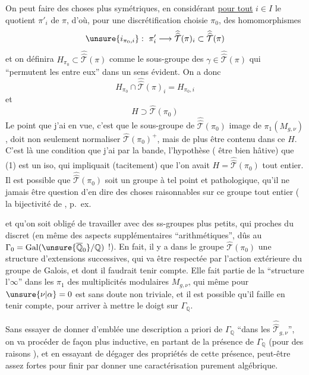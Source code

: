 On peut faire des choses plus symétriques, en considérant \uline{pour tout} $i\in I$ le quotient  $\pi'_i$ de $\pi$, d'où, pour une discrétification choisie $\pi_0$, des homomorphismes
\[
\unsure{i_{\pi_0,i}}:\ \pi'_i\longrightarrow
\widehat{\widehat{\mathcal T}}(\pi)_i\subset
\widehat{\widehat{\mathcal T}}(\pi)
\]
et on définira $H_{\pi_0}\subset\widehat{\widehat{\mathcal T}}(\pi)$ comme le sous-groupe des $\gamma\in\widehat{\widehat{\mathcal T}}(\pi)$ qui ``permutent les  entre eux'' dans un sens évident. On a donc
\[
\tag{7}
H_{\pi_0}\cap\widehat{\widehat{\mathcal T}}(\pi)_i=H_{\pi_0,i}
\]
et
\[
\tag{8}
H\supset\widehat{\mathcal T}(\pi_0)
\]
Le point que j'ai en vue, c'est que le sous-groupe de $\widehat{\widehat{\mathcal T}}(\pi_0)$ image de $\pi_1(M_{g,\nu})$, doit non seulement normaliser $\widehat{\mathcal T}(\pi_0)^+$, mais de plus être contenu dans ce $H$. C'est là une condition que j'ai  par la bande,  l'hypothèse ( être bien hâtive) que (1) est un iso, qui impliquait (tacitement) que l'on avait $H=\widehat{\widehat{\mathcal T}}(\pi_0)$ tout entier. Il est possible que $\widehat{\widehat{\mathcal T}}(\pi_0)$ soit un groupe à tel point  et pathologique, qu'il ne  jamais être question d'en dire des choses raisonnables  sur  ce groupe tout entier ( la bijectivité de , p.\ ex.



et qu'on soit obligé de travailler avec des ss-groupes plus petits, qui  proches du discret (en  même des aspects supplémentaires ``arithmétiques'', dûs au $\Gamma_0=\mathrm{Gal}(\unsure{\overline{\mathbb Q}_0}/\mathbb Q)$ !). En fait, il y a  dans le groupe $\widehat{\mathcal T}(\pi_0)$ une structure  d'extensions successives, qui va être respectée par l'action extérieure du groupe de Galois, et dont il faudrait tenir compte. Elle fait partie de la ``structure  l'$\infty$'' dans les $\pi_1$ des  multiplicités modulaires $M_{g,\nu}$, qui même pour $\unsure{\nu|\alpha}=0$ est sans doute non triviale, et il est possible qu'il faille en tenir compte, pour arriver à mettre le doigt sur $\Gamma_{\mathbb Q}$.

Sans essayer de donner d'emblée une description a priori de $\Gamma_{\mathbb Q}$ ``dans les $\widehat{\widehat{\mathcal T}}_{g,\nu}$'', on va procéder de façon plus inductive, en partant de la présence de $\Gamma_{\mathbb Q}$ (pour des raisons ), et en essayant de dégager des propriétés de cette présence, peut-être assez fortes pour finir par donner une caractérisation purement algébrique.

